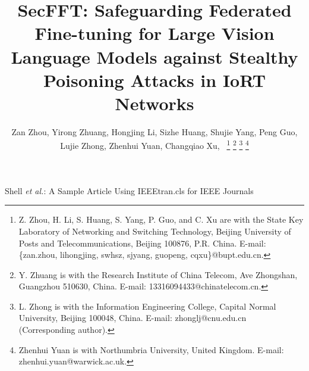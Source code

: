 \documentclass[lettersize,journal]{IEEEtran}
\begin{document}
\title{SecFFT: Safeguarding Federated Fine-tuning for Large Vision Language Models against Stealthy Poisoning Attacks in IoRT Networks}
 
\author{Zan Zhou, %
Yirong Zhuang, Hongjing Li, Sizhe Huang, Shujie Yang, Peng Guo, Lujie Zhong, Zhenhui Yuan, Changqiao Xu,~
\thanks{Z. Zhou, H. Li, S. Huang, S. Yang, P. Guo, and C. Xu are with the State Key Laboratory of Networking and Switching Technology, Beijing University of Posts and Telecommunications, Beijing 100876, P.R. China. E-mail: \{zan.zhou, lihongjing, swhsz, sjyang, guopeng, cqxu\}@bupt.edu.cn. 
	}  %
\thanks{Y. Zhuang is with the Research Institute of China Telecom, Ave Zhongshan, Guangzhou 510630, China. E-mail: 13316094433@chinatelecom.cn.}%
 \thanks{L. Zhong is with the Information Engineering College, Capital Normal University, Beijing 100048, China. E-mail: zhonglj@cnu.edu.cn (Corresponding author).}%
\thanks{Zhenhui Yuan is with Northumbria University, United Kingdom. E-mail: zhenhui.yuan@warwick.ac.uk.}%
}

%
{Shell \MakeLowercase{\textit{et al.}}: A Sample Article Using IEEEtran.cls for IEEE Journals}


\maketitle
\end{document}
